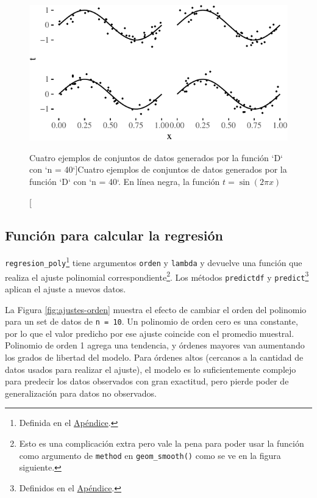 \documentclass[]{tufte-handout}
\begin{document}
\begin{figure}
\includegraphics{README_files/figure-latex/unnamed-chunk-2-1} \caption[Cuatro ejemplos de conjuntos de datos generados por la función `D` con `n = 40`]{Cuatro ejemplos de conjuntos de datos generados por la función `D` con `n = 40`. En línea negra, la función $t = \sin(2\pi x)$}\label{fig:unnamed-chunk-2}
\end{figure}

\hypertarget{funciuxf3n-para-calcular-la-regresiuxf3n}{%
\subsection{Función para calcular la regresión}\label{funciuxf3n-para-calcular-la-regresiuxf3n}}

\texttt{regresion\_poly}\footnote{Definida en el \protect\hyperlink{def-regr}{Apéndice}.} tiene argumentos \texttt{orden} y \texttt{lambda} y devuelve una función que realiza el ajuste polinomial correspondiente\footnote{Esto es una complicación extra pero vale la pena para poder usar la función como argumento de \texttt{method} en \texttt{geom\_smooth()} como se ve en la figura siguiente.}. Los métodos \texttt{predictdf} y \texttt{predict}\footnote{Definidos en el \protect\hyperlink{def-regr}{Apéndice}.} aplican el ajuste a nuevos datos.

La Figura \ref{fig:ajustes-orden} muestra el efecto de cambiar el orden del polinomio para un set de datos de \texttt{n\ =\ 10}. Un polinomio de orden cero es una constante, por lo que el valor predicho por ese ajuste coincide con el promedio muestral. Polinomio de orden 1 agrega una tendencia, y órdenes mayores van aumentando los grados de libertad del modelo. Para órdenes altos (cercanos a la cantidad de datos usados para realizar el ajuste), el modelo es lo suficientemente complejo para predecir los datos observados con gran exactitud, pero pierde poder de generalización para datos no observados.
\end{document}
